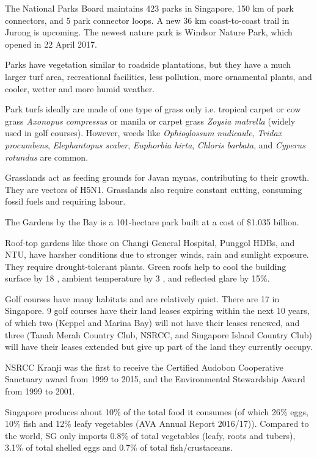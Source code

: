 \documentclass{slnotes}
\newcommand{\scn}[1]{\textit{#1}}
\begin{document}
The National Parks Board maintains 423 parks in Singapore, 150 km of park connectors, and 5 park connector loops. A new 36 km coast-to-coast trail in Jurong is upcoming. The newest nature park is Windsor Nature Park, which opened in 22 April 2017.

Parks have vegetation similar to roadside plantations, but they have a much larger turf area, recreational facilities, less pollution, more ornamental plants, and cooler, wetter and more humid weather.

Park turfs ideally are made of one type of grass only i.e. tropical carpet or cow grass \scn{Axonopus compressus} or manila or carpet grass \scn{Zoysia matrella} (widely used in golf courses). However, weeds like \scn{Ophioglossum nudicaule}, \scn{Tridax procumbens}, \scn{Elephantopus scaber}, \scn{Euphorbia hirta}, \scn{Chloris barbata}, and \scn{Cyperus rotundus} are common.

Grasslands act as feeding grounds for Javan mynas, contributing to their growth. They are vectors of H5N1. Grasslands also require constant cutting, consuming fossil fuels and requiring labour.

The Gardens by the Bay is a 101-hectare park built at a cost of \$1.035 billion.

Roof-top gardens like those on Changi General Hospital, Punggol HDBs, and NTU, have harsher conditions due to stronger winds, rain and sunlight exposure. They require drought-tolerant plants. Green roofs help to cool the building surface by 18 \textcelsius, ambient temperature by 3 \textcelsius, and reflected glare by 15\%.

Golf courses have many habitats and are relatively quiet. There are 17 in Singapore. 9 golf courses have their land leases expiring within the next 10 years, of which two (Keppel and Marina Bay) will not have their leases renewed, and three (Tanah Merah Country Club, NSRCC, and Singapore Island Country Club) will have their leases extended but give up part of the land they currently occupy.

NSRCC Kranji was the first to receive the Certified Audobon Cooperative Sanctuary award from 1999 to 2015, and the Environmental Stewardship Award from 1999 to 2001.

Singapore produces about 10\% of the total food it consumes (of which 26\% eggs, 10\% fish and 12\% leafy vegetables (AVA Annual Report 2016/17)). Compared to the world, SG only imports 0.8\% of total vegetables (leafy, roots and tubers), 3.1\% of total shelled eggs and 0.7\% of total fish/crustaceans.
\end{document}
